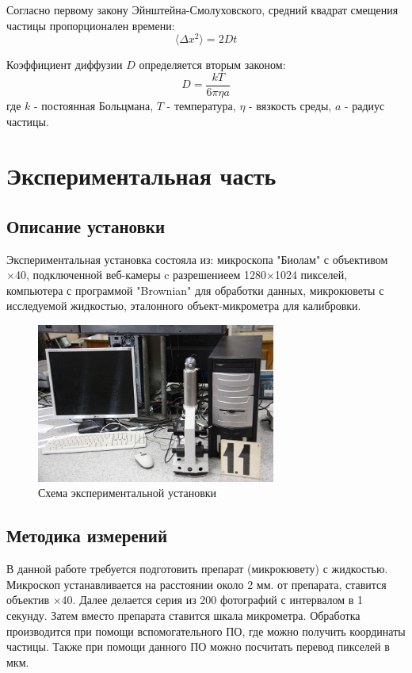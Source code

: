 \documentclass[a4paper,14pt]{article}
\begin{document}
Согласно первому закону Эйнштейна-Смолуховского, средний квадрат смещения частицы пропорционален времени:
\begin{equation}
    \langle \Delta x^2 \rangle = 2Dt
    \label{eq:first_law}
\end{equation}

Коэффициент диффузии $D$ определяется вторым законом:
\begin{equation}
    D = \frac{kT}{6\pi\eta a}
    \label{eq:second_law}
\end{equation}
где $k$ - постоянная Больцмана, $T$ - температура, $\eta$ - вязкость среды, $a$ - радиус частицы.

\section{Экспериментальная часть}
\subsection{Описание установки}
Экспериментальная установка состояла из: микроскопа "Биолам" с объективом ×40, подключенной веб-камеры c разрешениеем 1280×1024 пикселей, компьютера с программой "Brownian" для обработки данных, микрокюветы с исследуемой жидкостью, эталонного объект-микрометра для калибровки.


\begin{figure}[h]
    \centering
    \includegraphics[width=0.7\textwidth]{setup.jpg}
    \caption{Схема экспериментальной установки}
    \label{fig:setup}
\end{figure}

\subsection{Методика измерений}
В данной работе требуется подготовить препарат (микрокювету) с жидкостью. Микроскоп устанавливается на расстоянии около 2 мм. от препарата, ставится объектив ×40. Далее делается серия из 200 фотографий с интервалом в 1 секунду. Затем вместо препарата ставится шкала микрометра. Обработка производится при помощи вспомогательного ПО, где можно получить координаты частицы. Также при помощи данного ПО можно посчитать перевод пикселей в мкм.
\end{document}
